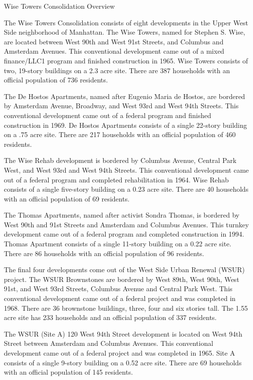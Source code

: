 Wise Towers Consolidation Overview

The Wise Towers Consolidation consists of eight developments in the Upper West Side neighborhood of Manhattan. The Wise Towers, named for Stephen S. Wise, are located between West 90th and West 91st Streets, and Columbus and Amsterdam Avenues. This conventional development came out of a mixed finance/LLC1 program and finished construction in 1965. Wise Towers consists of two, 19-story buildings on a 2.3 acre site. There are 387 households with an official population of 736 residents. 

The De Hostos Apartments, named after Eugenio Maria de Hostos, are bordered by Amsterdam Avenue, Broadway, and West 93rd and West 94th Streets. This conventional development came out of a federal program and finished construction in 1969. De Hostos Apartments consists of a single 22-story building on a .75 acre site. There are 217 households with an official population of 460 residents.

The Wise Rehab development is bordered by Columbus Avenue, Central Park West, and West 93rd and West 94th Streets. This conventional development came out of a federal program and completed rehabilitation in 1964. Wise Rehab consists of a single five-story building on a 0.23 acre site. There are 40 households with an official population of 69 residents.

The Thomas Apartments, named after activist Sondra Thomas, is bordered by West 90th and 91st Streets and Amsterdam and Columbus Avenues. This turnkey development came out of a federal program and completed construction in 1994. Thomas Apartment consists of a single 11-story building on a 0.22 acre site. There are 86 households with an official population of 96 residents. 

The final four developments come out of the West Side Urban Renewal (WSUR) project. The WSUR Brownstones are bordered by West 89th, West 90th, West 91st, and West 93rd Streets, Columbus Avenue and Central Park West. This conventional development came out of a federal project and was completed in 1968. There are 36 brownstone buildings, three, four and six stories tall. The 1.55 acre site has 233 households and an official population of 337 residents. 

The WSUR (Site A) 120 West 94th Street development is located on West 94th Street between Amsterdam and Columbus Avenues. This conventional development came out of a federal project and was completed in 1965. Site A consists of a single 9-story building on a 0.52 acre site. There are 69 households with an official population of 145 residents.

